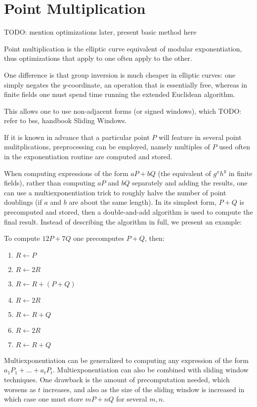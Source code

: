 \section {Point Multiplication}

TODO: mention optimizations later, present basic method here

Point multiplication is the elliptic curve equivalent of modular
exponentiation, thus optimizations that apply to one often apply to the other.

One difference is that group inversion is much cheaper in elliptic curves:
one simply negates the $y$-coordinate, an operation that is essentially free,
whereas in finite fields one must spend time running the extended
Euclidean algorithm.

This allows one to use non-adjacent forms (or signed windows), which
TODO: refer to bss, handbook
Sliding Windows.

If it is known in advance that a particular point $P$ will feature in
several point mulitplications, preprocessing can be employed, namely
multiples of $P$ used often in the exponentiation routine
are computed and stored.

When computing expressions
of the form $a P + b Q$ (the equivalent of $g^x h^y$ in
finite fields), rather than computing $a P$ and $b Q$ separately
and adding the results, one can use
a multiexponentiation trick to roughly halve the number of point doublings
(if $a$ and $b$ are about the same length).
In its simplest form, $P + Q$ is precomputed and stored,
then a double-and-add algorithm is used to compute the
final result. Instead of describing the algorithm in full, we present
an example:

To compute $12 P + 7 Q$ one precomputes $P + Q$, then:

\begin{enumerate}
\item
$R \leftarrow P$
\item
$R \leftarrow 2R$
\item
$R \leftarrow R + (P + Q)$
\item
$R \leftarrow 2R$
\item
$R \leftarrow R + Q$
\item
$R \leftarrow 2R$
\item
$R \leftarrow R + Q$
\end{enumerate}

Multiexponentiation can
be generalized to computing any expression of the form
$a_1 P_1 + ... + a_t P_t$. Multiexponentiation can also be combined with
sliding window techniques.
One drawback is the amount of precomputation needed,
which worsens as $t$ increases, and also as the size of the sliding window
is increased in which case one must store $m P + n Q$ for several $m, n$.

